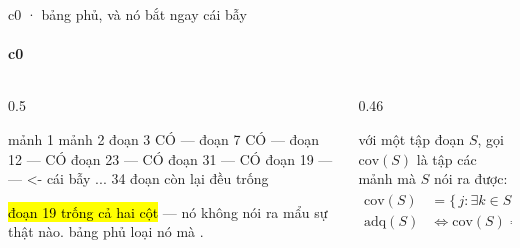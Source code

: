\begin{frame}[fragile]{c0 · bảng phủ, và nó bắt ngay cái bẫy}
  \framesubtitle{c0}
  \begin{columns}[t]
  \begin{column}{0.5\textwidth}
    \begin{bx}[title={bảng phủ của ví dụ — 0 lượt llm}]
      \begin{dia}
            mảnh 1   mảnh 2
đoạn  3     CÓ          —
đoạn  7     CÓ          —
đoạn 12       —        CÓ
đoạn 23       —        CÓ
đoạn 31       —        CÓ
đoạn 19       —         —     <- cái bẫy
... 34 đoạn còn lại đều trống
      \end{dia}
      \vspace{0.25em}
      \hl{đoạn 19 trống cả hai cột} — nó không nói ra mẩu sự thật nào. bảng phủ
      loại nó mà .
    \end{bx}
  \end{column}
  \begin{column}{0.46\textwidth}
    \begin{bx}[title={viết lại cho gọn}]
      với một tập đoạn $S$, gọi $\mathrm{cov}(S)$ là tập các mảnh mà $S$ nói ra được:
      \begin{align*}
        \mathrm{cov}(S) &= \{\, j : \exists k \in S,\; (k,j) = \text{CÓ} \,\}\\[0.15em]
        \mathrm{adq}(S) &\iff \mathrm{cov}(S) = \{1, \dots, J\}
      \end{align*}
      \vspace{0.3em}

    \end{bx}
  \end{column}
  \end{columns}
\end{frame}

